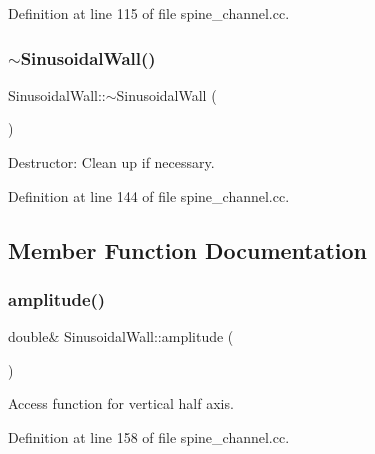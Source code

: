 Definition at line 115 of file spine\+\_\+channel.\+cc.

\mbox{\label{classSinusoidalWall_a7e5c29a951c707cb87e168ed943a7956}} 
\subsubsection{\texorpdfstring{$\sim$\+Sinusoidal\+Wall()}{~SinusoidalWall()}}
{\footnotesize\ttfamily Sinusoidal\+Wall\+::$\sim$\+Sinusoidal\+Wall (\begin{DoxyParamCaption}{ }\end{DoxyParamCaption})\hspace{0.3cm}{\ttfamily [inline]}}



Destructor\+: Clean up if necessary. 



Definition at line 144 of file spine\+\_\+channel.\+cc.



\subsection{Member Function Documentation}
\mbox{\label{classSinusoidalWall_a654a7ccf081040971442d8534f1e6807}} 
\subsubsection{\texorpdfstring{amplitude()}{amplitude()}}
{\footnotesize\ttfamily double\& Sinusoidal\+Wall\+::amplitude (\begin{DoxyParamCaption}{ }\end{DoxyParamCaption})\hspace{0.3cm}{\ttfamily [inline]}}



Access function for vertical half axis. 



Definition at line 158 of file spine\+\_\+channel.\+cc.

\mbox{\label{classSinusoidalWall_a96bda32ccbca0aa16a5d7e43ed2376e9}} 
